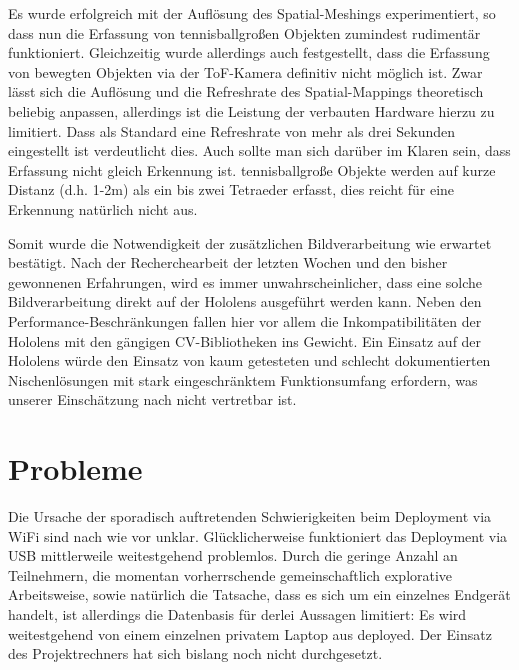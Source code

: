 \documentclass[conference, 11pt]{IEEEtran}
\begin{document}
Es wurde erfolgreich mit der Auflösung des Spatial-Meshings experimentiert, so dass nun die Erfassung von tennisballgroßen Objekten zumindest rudimentär funktioniert. Gleichzeitig wurde allerdings auch festgestellt, dass die Erfassung von bewegten Objekten via der ToF-Kamera definitiv nicht möglich ist. Zwar lässt sich die Auflösung und die Refreshrate des Spatial-Mappings theoretisch beliebig anpassen, allerdings ist die Leistung der verbauten Hardware hierzu zu limitiert. Dass als Standard eine Refreshrate von mehr als drei Sekunden eingestellt ist verdeutlicht dies. Auch sollte man sich darüber im Klaren sein, dass Erfassung nicht gleich Erkennung ist. tennisballgroße Objekte werden auf kurze Distanz (d.h. 1-2m) als ein bis zwei Tetraeder erfasst, dies reicht für eine Erkennung natürlich nicht aus.

Somit wurde die Notwendigkeit der zusätzlichen Bildverarbeitung wie erwartet bestätigt. Nach der Recherchearbeit der letzten Wochen und den bisher gewonnenen Erfahrungen, wird es immer unwahrscheinlicher, dass eine solche Bildverarbeitung direkt auf der Hololens ausgeführt werden kann. Neben den Performance-Beschränkungen fallen hier vor allem die Inkompatibilitäten der Hololens mit den gängigen CV-Bibliotheken ins Gewicht. Ein Einsatz auf der Hololens würde den Einsatz von kaum getesteten und schlecht dokumentierten Nischenlösungen mit stark eingeschränktem Funktionsumfang erfordern, was unserer Einschätzung nach nicht vertretbar ist.


\section{Probleme} 
Die Ursache der sporadisch auftretenden Schwierigkeiten beim Deployment via WiFi sind nach wie vor unklar. Glücklicherweise funktioniert das Deployment via USB mittlerweile weitestgehend problemlos. Durch die geringe Anzahl an Teilnehmern, die momentan vorherrschende gemeinschaftlich explorative Arbeitsweise, sowie natürlich die Tatsache, dass es sich um ein einzelnes Endgerät handelt, ist allerdings die Datenbasis für derlei Aussagen limitiert: Es wird weitestgehend von einem einzelnen privatem Laptop aus deployed. Der Einsatz des Projektrechners hat sich bislang noch nicht durchgesetzt.
\end{document}
